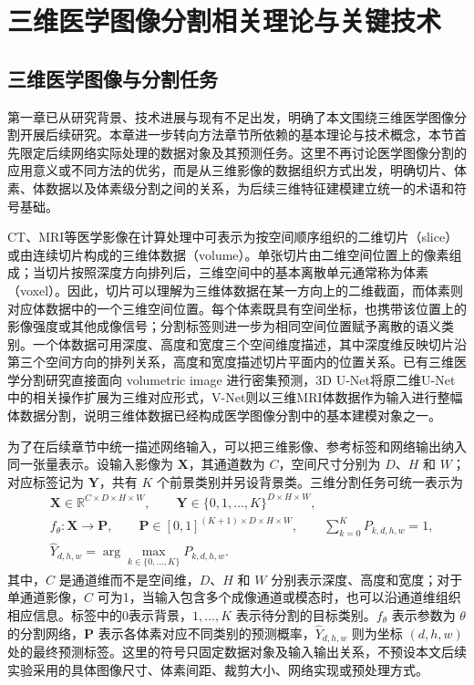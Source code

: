 \chapter{三维医学图像分割相关理论与关键技术}

\section{三维医学图像与分割任务}

第一章已从研究背景、技术进展与现有不足出发，明确了本文围绕三维医学图像分割开展后续研究。本章进一步转向方法章节所依赖的基本理论与技术概念，本节首先限定后续网络实际处理的数据对象及其预测任务。这里不再讨论医学图像分割的应用意义或不同方法的优劣，而是从三维影像的数据组织方式出发，明确切片、体素、体数据以及体素级分割之间的关系，为后续三维特征建模建立统一的术语和符号基础。

CT、MRI等医学影像在计算处理中可表示为按空间顺序组织的二维切片（slice）或由连续切片构成的三维体数据（volume）。单张切片由二维空间位置上的像素组成；当切片按照深度方向排列后，三维空间中的基本离散单元通常称为体素（voxel）。因此，切片可以理解为三维体数据在某一方向上的二维截面，而体素则对应体数据中的一个三维空间位置。每个体素既具有空间坐标，也携带该位置上的影像强度或其他成像信号；分割标签则进一步为相同空间位置赋予离散的语义类别。一个体数据可用深度、高度和宽度三个空间维度描述，其中深度维反映切片沿第三个空间方向的排列关系，高度和宽度描述切片平面内的位置关系。已有三维医学分割研究直接面向 volumetric image 进行密集预测，3D U-Net将原二维U-Net中的相关操作扩展为三维对应形式，V-Net则以三维MRI体数据作为输入进行整幅体数据分割，说明三维体数据已经构成医学图像分割中的基本建模对象之一。\cite{cicek2016threeDunet,milletari2016vnet}

为了在后续章节中统一描述网络输入，可以把三维影像、参考标签和网络输出纳入同一张量表示。设输入影像为 \(\mathbf{X}\)，其通道数为 \(C\)，空间尺寸分别为 \(D\)、\(H\) 和 \(W\)；对应标签记为 \(\mathbf{Y}\)，共有 \(K\) 个前景类别并另设背景类。三维分割任务可统一表示为
\begin{equation}
\label{eq:ch2-segmentation-task}
\begin{aligned}
&\mathbf{X}\in\mathbb{R}^{C\times D\times H\times W},\qquad
\mathbf{Y}\in\{0,1,\ldots,K\}^{D\times H\times W},\\
&f_{\theta}:\mathbf{X}\rightarrow\mathbf{P},\qquad
\mathbf{P}\in[0,1]^{(K+1)\times D\times H\times W},\qquad
\sum_{k=0}^{K}P_{k,d,h,w}=1,\\
&\hat{Y}_{d,h,w}=\arg\max_{k\in\{0,\ldots,K\}}P_{k,d,h,w}.
\end{aligned}
\end{equation}
其中，\(C\) 是通道维而不是空间维，\(D\)、\(H\) 和 \(W\) 分别表示深度、高度和宽度；对于单通道影像，\(C\) 可为1，当输入包含多个成像通道或模态时，也可以沿通道维组织相应信息。标签中的0表示背景，\(1,\ldots,K\) 表示待分割的目标类别。\(f_{\theta}\) 表示参数为 \(\theta\) 的分割网络，\(\mathbf{P}\) 表示各体素对应不同类别的预测概率，\(\hat{Y}_{d,h,w}\) 则为坐标 \((d,h,w)\) 处的最终预测标签。这里的符号只固定数据对象及输入输出关系，不预设本文后续实验采用的具体图像尺寸、体素间距、裁剪大小、网络实现或预处理方式。


